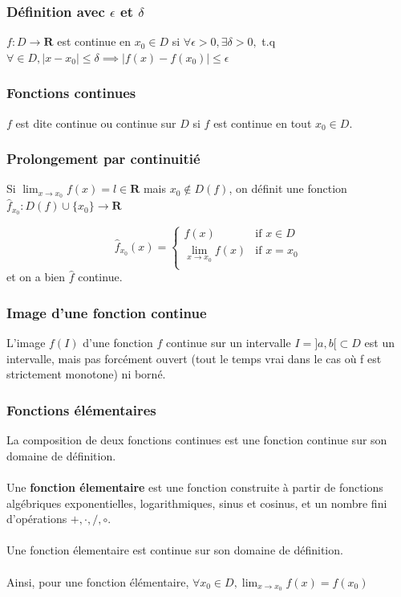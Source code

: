 \documentclass{article}
\begin{document}
\subsubsection{Définition avec $\epsilon $ et $\delta$}

$ f : D \to \mathbf{R} $ est continue en $ x_0 \in D $ si $ \forall \epsilon > 0, \exists \delta > 0, $ t.q $ \forall \in D, |x - x_0| \leq \delta \implies |f(x) - f(x_0)| \leq \epsilon$

\subsubsection{Fonctions continues}

$ f $ est dite continue ou continue sur $ D $ si $ f $ est continue en tout $ x_0 \in D $.

\subsubsection{Prolongement par continuitié}

Si $ \lim_{x\to{x_0}} f(x) = l \in \mathbf{R} $ mais $ x_0 \notin D(f) $, on définit une fonction $ \hat{f}_{x_0} : D(f) \cup \{x_0\} \to \mathbf{R} $

\begin{equation}
\hat{f}_{x_0}(x) = 
    \begin{cases}
        f(x) & \text{if } x \in D\\
        \lim_{x\to{x_0}}f(x) & \text{if } x = x_0\\
    \end{cases}
\end{equation}
et on a bien $ \hat{f} $ continue.

\subsubsection{Image d'une fonction continue}

L'image $ f(I) $ d'une fonction $f$ continue sur un intervalle $ I = ]a, b[ \subset D$ est un intervalle, mais pas forcément ouvert (tout le temps vrai dans le cas où f est strictement monotone) ni borné.

\subsubsection{Fonctions élémentaires}

La composition de deux fonctions continues est une fonction continue sur son domaine de définition.\\\\
Une \textbf{fonction élementaire} est une fonction construite à partir de fonctions algébriques exponentielles, logarithmiques, sinus et cosinus, et un nombre fini d'opérations $ +, \cdot, /, \circ $.\\\\
Une fonction élementaire est continue sur son domaine de définition.\\\\
Ainsi, pour une fonction élémentaire, $ \forall x_0 \in D, \lim_{x\to{x_0}} f(x) = f(x_0) $
\end{document}
